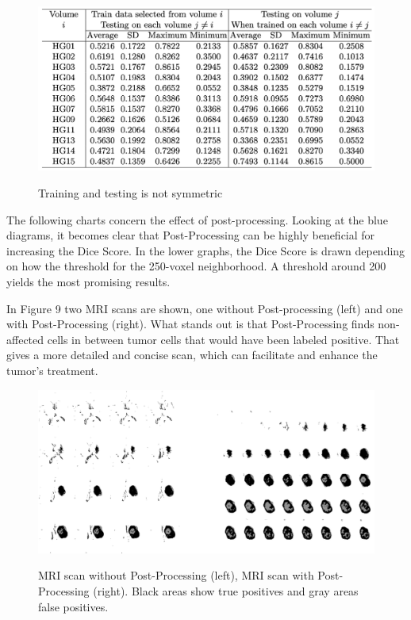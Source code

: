 \documentclass[
12pt,
headsepline,
bibliography=totoc,
twoside=semi,
fleqn
]{scrartcl}
\begin{document}
\newpage

 \begin{figure}[H]
 \centering \includegraphics[scale=0.7]{BDT17.png}\label{fig:fig17}
 \caption{Training and testing is not symmetric}
 \end{figure} 

 The following charts concern the effect of post-processing. Looking at the blue diagrams, it becomes clear that Post-Processing can be highly beneficial for increasing the Dice Score. In the lower graphs, the Dice Score is drawn depending on how the threshold for the 250-voxel neighborhood. A threshold around 200 yields the most promising results. 


 In Figure 9 two MRI scans are shown, one without Post-processing (left) and one with Post-Processing (right). What stands out is that Post-Processing finds non-affected cells in between tumor cells that would have been labeled positive. That gives a more detailed and concise scan, which can facilitate and enhance the tumor's treatment. 

 \begin{figure}[H]
 \centering \includegraphics[scale=0.7]{BDT19.png}\label{fig:fig19}
 \caption{MRI scan without Post-Processing (left), MRI scan with Post-Processing (right). Black areas show true positives and gray areas false positives.}
 \end{figure} 
\end{document}
